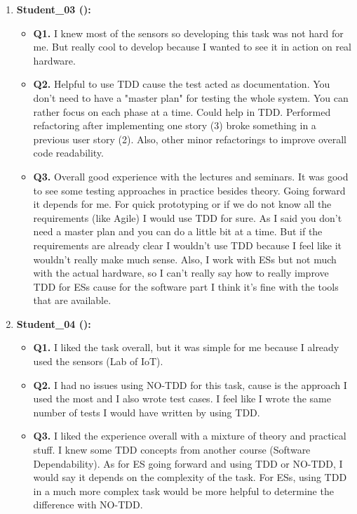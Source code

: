 \begin{enumerate}
    \item \textbf{Student\_03 (\tdd):}
    \begin{itemize}
        \item \textbf{Q1.} I knew most of the sensors so developing this task was not hard for me. But really cool to develop because I wanted to see it in action on real hardware.
        \item \textbf{Q2.} Helpful to use TDD cause the test acted as documentation. You don't need to have a "master plan" for testing the whole system. You can rather focus on each phase at a time. Could help in TDD. Performed refactoring after implementing one story (3) broke something in a previous user story (2). Also, other minor refactorings to improve overall code readability.
        \item \textbf{Q3.} Overall good experience with the lectures and seminars. It was good to see some testing approaches in practice besides theory. Going forward it depends for me. For quick prototyping or if we do not know all the requirements (like Agile) I would use TDD for sure. As I said you don’t need a master plan and you can do a little bit at a time. But if the requirements are already clear I wouldn't use TDD because I feel like it wouldn’t really make much sense. Also, I work with ESs but not much with the actual hardware, so I can’t really say how to really improve TDD for ESs cause for the software part I think it’s fine with the tools that are available.
    \end{itemize}

    \item \textbf{Student\_04 (\tdd):}
    \begin{itemize}
        \item \textbf{Q1.} I liked the task overall, but it was simple for me because I already used the sensors (Lab of IoT). 
        \item \textbf{Q2.} I had no issues using NO-TDD for this task, cause is the approach I used the most and I also wrote test cases. I feel like I wrote the same number of tests I would have written by using TDD.
        \item \textbf{Q3.} I liked the experience overall with a mixture of theory and practical stuff.  I knew some TDD concepts from another course (Software Dependability). As for ES going forward and using TDD or NO-TDD, I would say it depends on the complexity of the task. For ESs, using TDD in a much more complex task would be more helpful to determine the difference with NO-TDD. 
    \end{itemize}


\end{enumerate}

